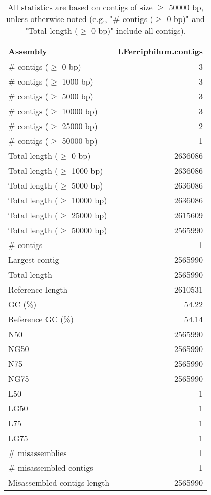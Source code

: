 \documentclass[12pt,a4paper]{article}
\begin{document}
\begin{table}[ht]
\begin{center}
\caption{All statistics are based on contigs of size $\geq$ 50000 bp, unless otherwise noted (e.g., "\# contigs ($\geq$ 0 bp)" and "Total length ($\geq$ 0 bp)" include all contigs).}
\begin{tabular}{|l*{1}{|r}|}
\hline
Assembly & LFerriphilum.contigs \\ \hline
\# contigs ($\geq$ 0 bp) & 3 \\ \hline
\# contigs ($\geq$ 1000 bp) & 3 \\ \hline
\# contigs ($\geq$ 5000 bp) & 3 \\ \hline
\# contigs ($\geq$ 10000 bp) & 3 \\ \hline
\# contigs ($\geq$ 25000 bp) & 2 \\ \hline
\# contigs ($\geq$ 50000 bp) & 1 \\ \hline
Total length ($\geq$ 0 bp) & 2636086 \\ \hline
Total length ($\geq$ 1000 bp) & 2636086 \\ \hline
Total length ($\geq$ 5000 bp) & 2636086 \\ \hline
Total length ($\geq$ 10000 bp) & 2636086 \\ \hline
Total length ($\geq$ 25000 bp) & 2615609 \\ \hline
Total length ($\geq$ 50000 bp) & 2565990 \\ \hline
\# contigs & 1 \\ \hline
Largest contig & 2565990 \\ \hline
Total length & 2565990 \\ \hline
Reference length & 2610531 \\ \hline
GC (\%) & 54.22 \\ \hline
Reference GC (\%) & 54.14 \\ \hline
N50 & 2565990 \\ \hline
NG50 & 2565990 \\ \hline
N75 & 2565990 \\ \hline
NG75 & 2565990 \\ \hline
L50 & 1 \\ \hline
LG50 & 1 \\ \hline
L75 & 1 \\ \hline
LG75 & 1 \\ \hline
\# misassemblies & 1 \\ \hline
\# misassembled contigs & 1 \\ \hline
Misassembled contigs length & 2565990 \\ \hline

\end{tabular}
\end{center}
\end{table}
\end{document}
